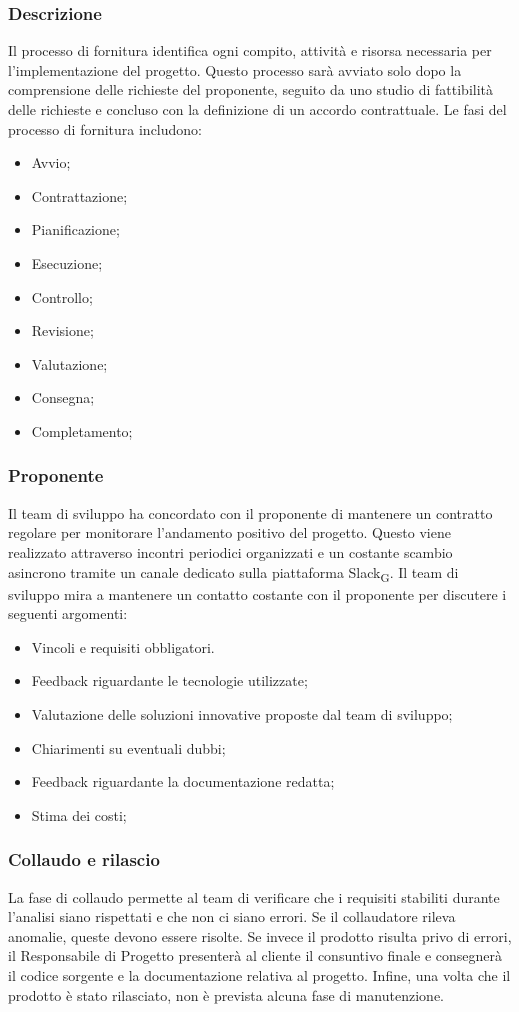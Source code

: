 \documentclass{article}
\begin{document}
\subsubsection{Descrizione}
Il processo di fornitura identifica ogni compito, attività e risorsa necessaria per l'implementazione del progetto. Questo processo sarà avviato solo dopo la comprensione delle richieste del proponente, seguito da uno studio di fattibilità delle richieste e concluso con la definizione di un accordo contrattuale. Le fasi del processo di fornitura includono:
\begin{itemize}
    \item Avvio;
    \item Contrattazione;
    \item Pianificazione;
    \item Esecuzione;
    \item Controllo;
    \item Revisione;
    \item Valutazione;
    \item Consegna;
    \item Completamento;
\end{itemize}

\subsubsection{Proponente}
Il team di sviluppo ha concordato con il proponente di mantenere un contratto regolare per monitorare l'andamento positivo del progetto. Questo viene realizzato attraverso incontri periodici organizzati e un costante scambio asincrono tramite un canale dedicato sulla piattaforma Slack\textsubscript{G}. Il team di sviluppo mira a mantenere un contatto costante con il proponente per discutere i seguenti argomenti:
\begin{itemize}
    \item Vincoli e requisiti obbligatori.
    \item Feedback riguardante le tecnologie utilizzate;
    \item Valutazione delle soluzioni innovative proposte dal team di sviluppo;
    \item Chiarimenti su eventuali dubbi;
    \item Feedback riguardante la documentazione redatta;
    \item Stima dei costi;
\end{itemize}

\subsubsection{Collaudo e rilascio}
La fase di collaudo permette al team di verificare che i requisiti stabiliti durante l'analisi siano rispettati e che non ci siano errori. Se il collaudatore rileva anomalie, queste devono essere risolte. Se invece il prodotto risulta privo di errori, il Responsabile di Progetto presenterà al cliente il consuntivo finale e consegnerà il codice sorgente e la documentazione relativa al progetto. Infine, una volta che il prodotto è stato rilasciato, non è prevista alcuna fase di manutenzione.
\end{document}
